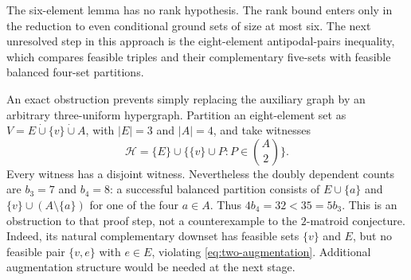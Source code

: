The six-element lemma has no rank hypothesis. The rank bound enters only
in the reduction to even conditional ground sets of size at most six.
The next unresolved step in this approach is the eight-element
antipodal-pairs inequality, which compares feasible triples and their
complementary five-sets with feasible balanced four-set partitions.

An exact obstruction prevents simply replacing the auxiliary graph by an
arbitrary three-uniform hypergraph. Partition an eight-element set as
$V=E\mathbin{\dot\cup}\{v\}\mathbin{\dot\cup}A$, with $|E|=3$ and
$|A|=4$, and take witnesses
\[
\mathcal H=\{E\}\cup\{\{v\}\cup P:P\in\binom A2\}.
\]
Every witness has a disjoint witness. Nevertheless the doubly dependent
counts are $b_3=7$ and $b_4=8$: a successful balanced partition consists
of $E\cup\{a\}$ and $\{v\}\cup(A\setminus\{a\})$ for one of the four
$a\in A$. Thus $4b_4=32<35=5b_3$. This is an obstruction to that proof
step, not a counterexample to the $2$-matroid conjecture. Indeed, its
natural complementary downset has feasible sets $\{v\}$ and $E$, but no
feasible pair $\{v,e\}$ with $e\in E$, violating
\eqref{eq:two-augmentation}. Additional augmentation structure would be
needed at the next stage.
